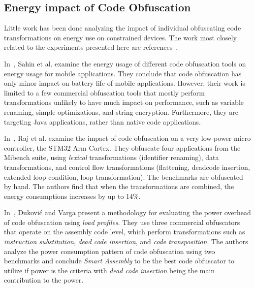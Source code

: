 \subsection{Energy impact of Code Obfuscation}

Little work has been done analyzing the impact of individual obfuscating code transformations on energy use on constrained devices. The work most closely related to the experiments presented here are references~\cite{6976079, dhukovic2015load, raj2017modelling}. 

In~\cite{6976079}, Sahin et al. examine the energy usage of different code obfuscation tools on energy usage for mobile applications. They conclude that code obfuscation has only minor impact on battery life of mobile applications. However, their work is limited to a few  commercial obfuscation tools that mostly perform transformations unlikely to have much impact on performance, such as variable renaming, simple optimizations, and string encryption. Furthermore, they are targeting Java applications, rather than native code applications.

In~\cite{raj2017modelling}, Raj et al. 
examine the impact of code obfuscation on a very low-power micro controller, the STM32 Arm Cortex. They obfuscate four applications from the Mibench suite, using {\em lexical} transformations (identifier renaming), data transformations, and control flow transformations (flattening, deadcode insertion, extended loop condition, loop transformation). The benchmarks are obfuscated by hand. The authors find that when the transformations are combined, the energy consumptions increases by up to 14\%.

In~\cite{dhukovic2015load}, Dukovi\'{c} and Varga present a methodology for evaluating the power overhead of code obfuscation using {\em load profiles}.
They use three commercial obfuscators that operate on the assembly code level, which perform transformations such as {\em instruction substitution}, {\em dead code insertion}, and {\em code transposition}. The authors analyze the power consumption pattern of code obfuscation using two benchmarks and conclude {\em Smart Assembly} to be the best code obfuscator to utilize if power is the criteria with {\em dead code insertion} being the main contribution to the power.   

\endinput

rather than a taxonomy of obfuscation techniques, and ii) they do not analyze the detailed impact of a suite of available code obfuscation techniques ~\cite{tigress} to suggest particular obfuscation techniques that can be utilized for resource-constrained devices. 
In this paper, we fill this gap by analyzing the energy impact of various obfuscation techniques in order to suggest the use of specific obfuscation techniques provided a given energy constraint.  
